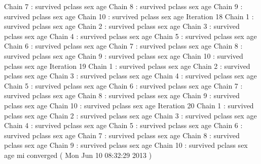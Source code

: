 \begin{Schunk}
\begin{Soutput}
 Chain 7 : survived   pclass   sex   age   
 Chain 8 : survived   pclass   sex   age   
 Chain 9 : survived   pclass   sex   age   
 Chain 10 : survived   pclass   sex   age   
Iteration 18 
 Chain 1 : survived   pclass   sex   age   
 Chain 2 : survived   pclass   sex   age   
 Chain 3 : survived   pclass   sex   age   
 Chain 4 : survived   pclass   sex   age   
 Chain 5 : survived   pclass   sex   age   
 Chain 6 : survived   pclass   sex   age   
 Chain 7 : survived   pclass   sex   age   
 Chain 8 : survived   pclass   sex   age   
 Chain 9 : survived   pclass   sex   age   
 Chain 10 : survived   pclass   sex   age   
Iteration 19 
 Chain 1 : survived   pclass   sex   age   
 Chain 2 : survived   pclass   sex   age   
 Chain 3 : survived   pclass   sex   age   
 Chain 4 : survived   pclass   sex   age   
 Chain 5 : survived   pclass   sex   age   
 Chain 6 : survived   pclass   sex   age   
 Chain 7 : survived   pclass   sex   age   
 Chain 8 : survived   pclass   sex   age   
 Chain 9 : survived   pclass   sex   age   
 Chain 10 : survived   pclass   sex   age   
Iteration 20 
 Chain 1 : survived   pclass   sex   age   
 Chain 2 : survived   pclass   sex   age   
 Chain 3 : survived   pclass   sex   age   
 Chain 4 : survived   pclass   sex   age   
 Chain 5 : survived   pclass   sex   age   
 Chain 6 : survived   pclass   sex   age   
 Chain 7 : survived   pclass   sex   age   
 Chain 8 : survived   pclass   sex   age   
 Chain 9 : survived   pclass   sex   age   
 Chain 10 : survived   pclass   sex   age   
mi converged ( Mon Jun 10 08:32:29 2013 )
\end{Soutput}
\end{Schunk}
